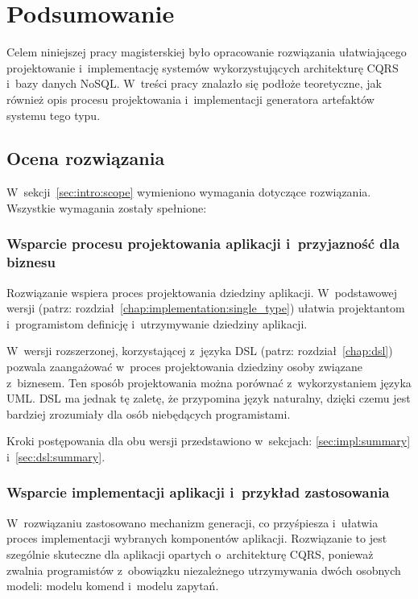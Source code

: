 \chapter{Podsumowanie} \label{chap:outro}

Celem niniejszej pracy magisterskiej było opracowanie rozwiązania ułatwiającego projektowanie i~implementację systemów wykorzystujących architekturę CQRS i~bazy danych NoSQL.
W~treści pracy znalazło się podłoże teoretyczne, jak również opis procesu projektowania i~implementacji generatora artefaktów systemu tego typu.



\section{Ocena rozwiązania}

W~sekcji~\ref{sec:intro:scope} wymieniono wymagania dotyczące rozwiązania.
Wszystkie wymagania zostały spełnione:


\subsection{Wsparcie procesu projektowania aplikacji i~przyjazność dla biznesu}

Rozwiązanie wspiera proces projektowania dziedziny aplikacji.
W~podstawowej wersji (patrz: rozdział~\ref{chap:implementation:single_type}) ułatwia projektantom i~programistom definicję i~utrzymywanie dziedziny aplikacji.

W~wersji rozszerzonej, korzystającej z~języka DSL (patrz: rozdział~\ref{chap:dsl}) pozwala zaangażować w~proces projektowania dziedziny osoby związane z~biznesem.
Ten sposób projektowania można porównać z~wykorzystaniem języka UML.
DSL ma jednak tę zaletę, że przypomina język naturalny, dzięki czemu jest bardziej zrozumiały dla osób niebędących programistami.

Kroki postępowania dla obu wersji przedstawiono w~sekcjach: \ref{sec:impl:summary} i~\ref{sec:dsl:summary}.


\subsection{Wsparcie implementacji aplikacji i~przykład zastosowania}

W~rozwiązaniu zastosowano mechanizm generacji, co przyśpiesza i~ułatwia proces implementacji wybranych komponentów aplikacji.
Rozwiązanie to jest szególnie skuteczne dla aplikacji opartych o~architekturę CQRS, ponieważ zwalnia programistów z~obowiązku niezależnego utrzymywania dwóch osobnych modeli: modelu komend i~modelu zapytań.


